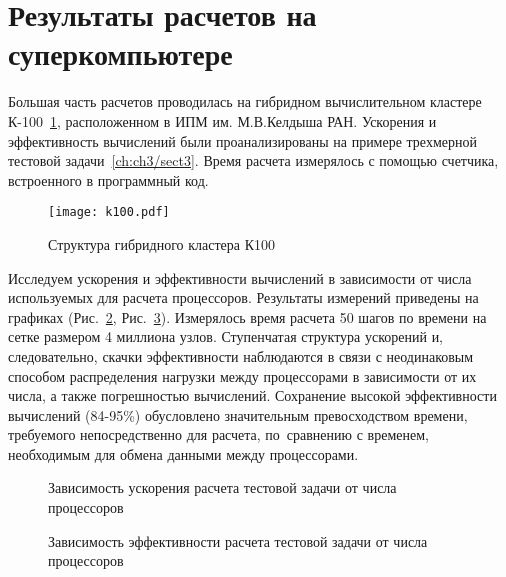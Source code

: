 \section{Результаты расчетов на суперкомпьютере} \label{ch:ch4/sect2}

Большая часть расчетов проводилась на гибридном вычислительном кластере К-100~\ref{pic_k100}, расположенном в ИПМ им. М.В.Келдыша РАН.
Ускорения и эффективность вычислений были проанализированы на примере трехмерной тестовой задачи~\ref{ch:ch3/sect3}.
Время расчета измерялось с помощью счетчика, встроенного в программный код.

\begin{figure}[!ht]
\centering
\texttt{[image: k100.pdf]} 
\caption{Структура гибридного кластера К100}
\label{pic_k100}
\end{figure}

Исследуем ускорения и эффективности вычислений в зависимости от числа
используемых для расчета процессоров. Результаты измерений приведены
на графиках (Рис.~\ref{mpi_speedup}, Рис.~\ref{mpi_eff}).
Измерялось время расчета 50 шагов по времени на сетке размером 4 миллиона узлов.
Ступенчатая структура ускорений и, следовательно, скачки эффективности наблюдаются
в связи с неодинаковым способом распределения нагрузки между процессорами
в зависимости от их числа, а также погрешностью вычислений. Сохранение высокой
эффективности вычислений (84-95\%) обусловлено значительным превосходством времени, требуемого
непосредственно для расчета, по~сравнению с временем, необходимым для обмена данными
между процессорами.

\begin{figure}[!ht]
\centering
{}
\caption{Зависимость ускорения расчета тестовой задачи от числа процессоров}
\label{mpi_speedup}
\end{figure}

\begin{figure}[!ht]
\centering
{}
\caption{Зависимость эффективности расчета тестовой задачи от числа процессоров}
\label{mpi_eff}
\end{figure}

